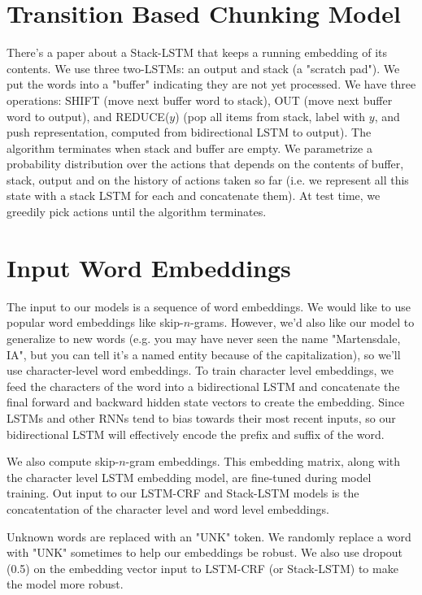 \documentclass[a4paper]{article}
\begin{document}
\section{Transition Based Chunking Model}
There's a paper about a Stack-LSTM that keeps a running embedding of its
contents. We use three two-LSTMs: an output and stack (a "scratch pad").
We put the words into a "buffer" indicating they are not yet processed.
We have three operations: SHIFT (move next buffer word to stack), OUT (move
next buffer word to output), and REDUCE($y$) (pop all items from stack,
label with $y$, and push representation, computed from bidirectional LSTM to output).
The algorithm terminates
when stack and buffer are empty. We parametrize a probability distribution
over the actions that depends on the contents of buffer, stack, output and 
on the history of actions taken so far (i.e. we represent all this state with
a stack LSTM for each and concatenate them). At test time, we greedily pick
actions until the algorithm terminates.

\section{Input Word Embeddings}
The input to our models is a sequence of word embeddings. We would like
to use popular word embeddings like skip-$n$-grams. However, we'd also
like our model to generalize to new words (e.g. you may have never seen the
name "Martensdale, IA", but you can tell it's a named entity because of the
capitalization), so we'll use character-level word embeddings. To train
character level embeddings, we feed the characters of the word into a
bidirectional LSTM and concatenate the final forward and backward hidden
state vectors to create the embedding. Since LSTMs and other RNNs tend to
bias towards their most recent inputs, so our bidirectional LSTM will 
effectively encode the prefix and suffix of the word.

We also compute skip-$n$-gram embeddings. This embedding matrix, along with the
character level LSTM embedding model, are fine-tuned during model training. Out
input to our LSTM-CRF and Stack-LSTM models is the concatentation of
the character level and word level embeddings.

Unknown words are replaced with an "UNK" token. We randomly replace a word
with "UNK" sometimes to help our embeddings be robust. We also use dropout (0.5)
on the embedding vector input to LSTM-CRF (or Stack-LSTM) to make the model
more robust.
\end{document}
